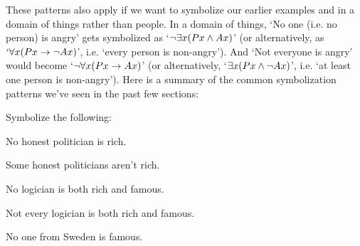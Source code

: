 These patterns also apply if we want to symbolize our earlier examples  and  in a domain of things rather than people.  In a domain of things, `No one (i.e. no person) is angry' gets symbolized as `$\neg \exists x(Px \wedge Ax)$' (or alternatively, as $`\forall x(Px \rightarrow \neg Ax)$', i.e. `every person is non-angry').  And `Not everyone is angry' would become `$\neg \forall x(Px \rightarrow Ax)$' (or alternatively, `$\exists x(Px \wedge \neg Ax)$', i.e. `at least one person is non-angry').   Here is a summary of the common symbolization patterns we've seen in the past few sections:



\practiceproblems
\problempart Symbolize the following: 

\begin{earg}

\item No honest politician is rich.

\item Some honest politicians aren't rich.

\item No logician is both rich and famous.

\item Not every logician is both rich and famous.

\item No one from Sweden is famous.

\end{earg}




